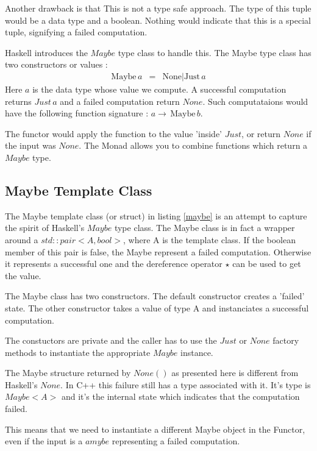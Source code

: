 \documentclass[12pt,fleqn]{article}
\begin{document}
Another drawback is that This is not a type safe approach.
The type of this tuple would be a data type and a boolean. Nothing would indicate that this is a special tuple, signifying a failed computation.

Haskell introduces the $Maybe$ type class to handle this.
The Maybe type class has two constructors or values :
%
\begin{eqnarray*}
\mbox{Maybe}\, a &=& \mbox{None} | \mbox{Just} \, a
\end{eqnarray*}
%
Here $a$ is the data type whose value we compute.
A successful computation returns $Just \, a$ and a failed computation return $None$.
Such computataions would have the following function signature : $ a \rightarrow \, \mbox{Maybe}\, b$.

 
The functor would apply the function to the value 'inside' $Just$, or return $None$ if the input was $None$.
The Monad allows you to combine functions which return a $Maybe$ type.

%
\subsection{Maybe Template Class}
%
%
The Maybe template class (or struct) in listing \ref{maybe} is an attempt to capture the spirit of Haskell's $Maybe$ type class.
The Maybe class is in fact a wrapper around a $std::pair<A,bool>$, where A is the template class.
If the boolean member of this pair is false, the Maybe represent a failed computation.
Otherwise it represents a successful one and the dereference operator $\star$ can be used to get the value.

The Maybe class has two constructors. The default constructor creates a 'failed' state. 
The other constructor takes a value of type A and instanciates a successful computation.

The constuctors are private and the caller has to use the $Just$ or $None$ factory methods to instantiate the appropriate $Maybe$ instance.

The Maybe structure returned by $None()$ as presented here is different from Haskell's $None$. 
In C++ this failure still has a type associated with it. 
It's type is $Maybe<A>$ and it's the internal state which indicates that the computation failed.

This means that we need to instantiate a different  Maybe object in the Functor, 
even if the input is a $amybe$ representing a failed computation.
\end{document}
